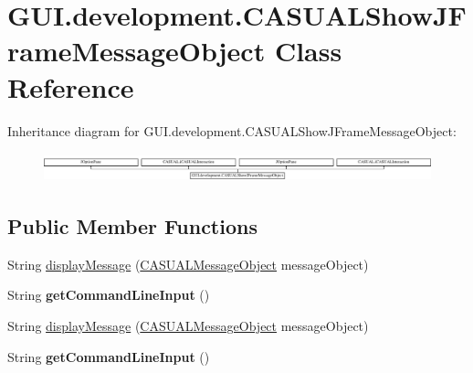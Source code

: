 \hypertarget{classGUI_1_1development_1_1CASUALShowJFrameMessageObject}{\section{G\-U\-I.\-development.\-C\-A\-S\-U\-A\-L\-Show\-J\-Frame\-Message\-Object Class Reference}
\label{classGUI_1_1development_1_1CASUALShowJFrameMessageObject}
}
Inheritance diagram for G\-U\-I.\-development.\-C\-A\-S\-U\-A\-L\-Show\-J\-Frame\-Message\-Object\-:\begin{figure}[H]
\begin{center}
\leavevmode
\includegraphics[height=0.845922cm]{classGUI_1_1development_1_1CASUALShowJFrameMessageObject}
\end{center}
\end{figure}
\subsection*{Public Member Functions}
\begin{DoxyCompactItemize}
\item 
String \hyperlink{classGUI_1_1development_1_1CASUALShowJFrameMessageObject_a2ea27451cd76c3c64404413fca107310}{display\-Message} (\hyperlink{classCASUAL_1_1CASUALMessageObject}{C\-A\-S\-U\-A\-L\-Message\-Object} message\-Object)
\item 
\hypertarget{classGUI_1_1development_1_1CASUALShowJFrameMessageObject_a2a1e31b0b8eee95f6023a103f3fca73f}{String {\bfseries get\-Command\-Line\-Input} ()}\label{classGUI_1_1development_1_1CASUALShowJFrameMessageObject_a2a1e31b0b8eee95f6023a103f3fca73f}

\item 
String \hyperlink{classGUI_1_1development_1_1CASUALShowJFrameMessageObject_a2ea27451cd76c3c64404413fca107310}{display\-Message} (\hyperlink{classCASUAL_1_1CASUALMessageObject}{C\-A\-S\-U\-A\-L\-Message\-Object} message\-Object)
\item 
\hypertarget{classGUI_1_1development_1_1CASUALShowJFrameMessageObject_a2a1e31b0b8eee95f6023a103f3fca73f}{String {\bfseries get\-Command\-Line\-Input} ()}\label{classGUI_1_1development_1_1CASUALShowJFrameMessageObject_a2a1e31b0b8eee95f6023a103f3fca73f}

\end{DoxyCompactItemize}
